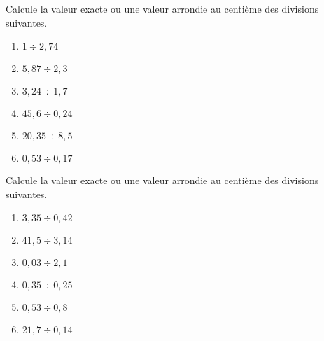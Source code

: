 \begin{exercice} 
Calcule la valeur exacte ou une valeur arrondie au centième des divisions suivantes.
\begin{enumerate} 
 \item $1 \div 2,74$ \dotfill \hspace*{11em}

 \item $5,87 \div 2,3$ \dotfill \hspace*{11em}

 \item $3,24 \div 1,7$ \dotfill \hspace*{11em}

 \item $45,6 \div 0,24$ \dotfill \hspace*{11em}

 \item $20,35 \div 8,5$ \dotfill \hspace*{11em}

 \item $0,53 \div 0,17$ \dotfill \hspace*{11em}

 \end{enumerate}
\end{exercice}


\begin{exercice} 
Calcule la valeur exacte ou une valeur arrondie au centième des divisions suivantes.
\begin{enumerate} 
 \item $3,35 \div 0,42$ \dotfill \hspace*{11em}

 \item $41,5 \div 3,14$ \dotfill \hspace*{11em}

 \item $ 0,03 \div 2,1$ \dotfill \hspace*{11em}

 \item $0,35 \div 0,25$ \dotfill \hspace*{11em}

 \item $0,53 \div 0,8$ \dotfill \hspace*{11em}

 \item $21,7 \div 0,14$ \dotfill \hspace*{11em}

 \end{enumerate}
\end{exercice}

